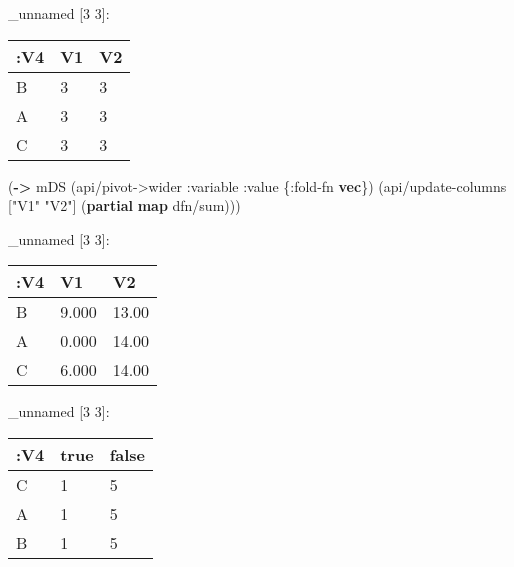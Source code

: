 \documentclass[]{article}
\newenvironment{Shaded}{\begin{snugshade}}{\end{snugshade}}
\newcommand{\AttributeTok}[1]{\textcolor[rgb]{0.77,0.63,0.00}{#1}}
\newcommand{\DecValTok}[1]{\textcolor[rgb]{0.00,0.00,0.81}{#1}}
\newcommand{\KeywordTok}[1]{\textcolor[rgb]{0.13,0.29,0.53}{\textbf{#1}}}
\newcommand{\NormalTok}[1]{#1}
\newcommand{\StringTok}[1]{\textcolor[rgb]{0.31,0.60,0.02}{#1}}
\newcommand{\VariableTok}[1]{\textcolor[rgb]{0.00,0.00,0.00}{#1}}
\begin{document}
\_unnamed {[}3 3{]}:

\begin{longtable}[]{@{}lll@{}}
\toprule
:V4 & V1 & V2\tabularnewline
\midrule
\endhead
B & 3 & 3\tabularnewline
A & 3 & 3\tabularnewline
C & 3 & 3\tabularnewline
\bottomrule
\end{longtable}

\begin{Shaded}
\begin{Highlighting}[]
\NormalTok{(}\KeywordTok{->}\NormalTok{ mDS}
\NormalTok{    (api/pivot->wider }\AttributeTok{:variable} \AttributeTok{:value}\NormalTok{ \{}\AttributeTok{:fold-fn} \KeywordTok{vec}\NormalTok{\})}
\NormalTok{    (api/update-columns [}\StringTok{"V1"} \StringTok{"V2"}\NormalTok{] (}\KeywordTok{partial} \KeywordTok{map}\NormalTok{ dfn/sum)))}
\end{Highlighting}
\end{Shaded}

\_unnamed {[}3 3{]}:

\begin{longtable}[]{@{}lll@{}}
\toprule
:V4 & V1 & V2\tabularnewline
\midrule
\endhead
B & 9.000 & 13.00\tabularnewline
A & 0.000 & 14.00\tabularnewline
C & 6.000 & 14.00\tabularnewline
\bottomrule
\end{longtable}

\begin{Shaded}
\end{Shaded}

\_unnamed {[}3 3{]}:

\begin{longtable}[]{@{}lll@{}}
\toprule
:V4 & true & false\tabularnewline
\midrule
\endhead
C & 1 & 5\tabularnewline
A & 1 & 5\tabularnewline
B & 1 & 5\tabularnewline
\bottomrule
\end{longtable}
\end{document}
